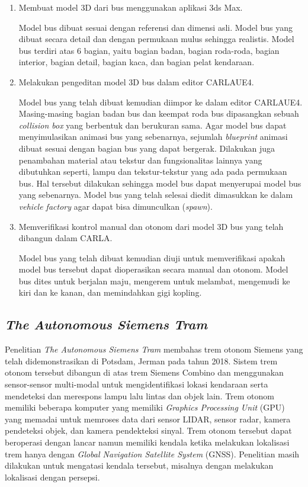 \begin{enumerate}

    \item Membuat model 3D dari bus menggunakan aplikasi 3ds Max.

    Model bus dibuat sesuai dengan referensi dan dimensi asli. Model bus yang
    dibuat secara detail dan dengan permukaan mulus sehingga realistis. Model
    bus terdiri atas 6 bagian, yaitu bagian badan, bagian roda-roda, bagian
    interior, bagian detail, bagian kaca, dan bagian pelat kendaraan.

    \item Melakukan pengeditan model 3D bus dalam editor CARLAUE4.

    Model bus yang telah dibuat kemudian diimpor ke dalam editor CARLAUE4.
    Masing-masing bagian badan bus dan keempat roda bus dipasangkan sebuah
    \textit{collision box} yang berbentuk dan berukuran sama. Agar model bus
    dapat menyimulasikan animasi bus yang sebenarnya, sejumlah
    \textit{blueprint} animasi dibuat sesuai dengan bagian bus yang dapat
    bergerak. Dilakukan juga penambahan material atau tekstur dan fungsionalitas
    lainnya yang dibutuhkan seperti, lampu dan tekstur-tekstur yang ada pada
    permukaan bus. Hal tersebut dilakukan sehingga model bus dapat menyerupai
    model bus yang sebenarnya. Model bus yang telah selesai diedit dimasukkan ke
    dalam \textit{vehicle factory} agar dapat bisa dimunculkan (\textit{spawn}).

    \item Memverifikasi kontrol manual dan otonom dari model 3D bus yang telah
    dibangun dalam CARLA.

    Model bus yang telah dibuat kemudian diuji untuk memverifikasi apakah model
    bus tersebut dapat dioperasikan secara manual dan otonom. Model bus dites
    untuk berjalan maju, mengerem untuk melambat, mengemudi ke kiri dan ke
    kanan, dan memindahkan gigi kopling.

\end{enumerate}

\subsection{\textit{The Autonomous Siemens Tram} \parencite{at-palmer}}

Penelitian \textit{The Autonomous Siemens Tram} membahas trem otonom Siemens
yang telah didemonstrasikan di Potsdam, Jerman pada tahun 2018. Sistem trem
otonom tersebut dibangun di atas trem Siemens Combino dan menggunakan
sensor-sensor multi-modal untuk mengidentifikasi lokasi kendaraan serta
mendeteksi dan merespons lampu lalu lintas dan objek lain. Trem otonom memiliki
beberapa komputer yang memiliki \textit{Graphics Processing Unit} (GPU) yang
memadai untuk memroses data dari sensor LIDAR, sensor radar, kamera pendeteksi
objek, dan kamera pendekteksi sinyal. Trem otonom tersebut dapat beroperasi
dengan lancar namun memiliki kendala ketika melakukan lokalisasi trem hanya
dengan \textit{Global Navigation Satellite System} (GNSS). Penelitian masih
dilakukan untuk mengatasi kendala tersebut, misalnya dengan melakukan lokalisasi
dengan persepsi.
